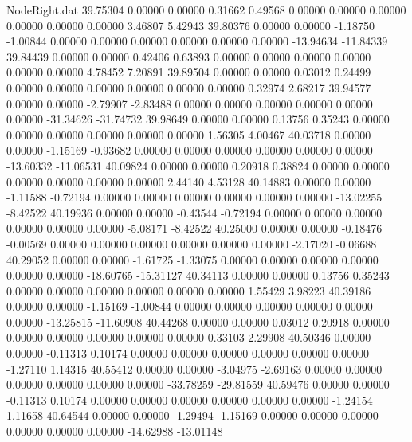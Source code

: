 \begin{filecontents}{NodeRight.dat}
  39.75304    0.00000    0.00000     0.31662    0.49568    0.00000    0.00000    0.00000    0.00000    0.00000    0.00000    3.46807    5.42943
  39.80376    0.00000    0.00000    -1.18750   -1.00844    0.00000    0.00000    0.00000    0.00000    0.00000    0.00000  -13.94634  -11.84339
  39.84439    0.00000    0.00000     0.42406    0.63893    0.00000    0.00000    0.00000    0.00000    0.00000    0.00000    4.78452    7.20891
  39.89504    0.00000    0.00000     0.03012    0.24499    0.00000    0.00000    0.00000    0.00000    0.00000    0.00000    0.32974    2.68217
  39.94577    0.00000    0.00000    -2.79907   -2.83488    0.00000    0.00000    0.00000    0.00000    0.00000    0.00000  -31.34626  -31.74732
  39.98649    0.00000    0.00000     0.13756    0.35243    0.00000    0.00000    0.00000    0.00000    0.00000    0.00000    1.56305    4.00467
  40.03718    0.00000    0.00000    -1.15169   -0.93682    0.00000    0.00000    0.00000    0.00000    0.00000    0.00000  -13.60332  -11.06531
  40.09824    0.00000    0.00000     0.20918    0.38824    0.00000    0.00000    0.00000    0.00000    0.00000    0.00000    2.44140    4.53128
  40.14883    0.00000    0.00000    -1.11588   -0.72194    0.00000    0.00000    0.00000    0.00000    0.00000    0.00000  -13.02255   -8.42522
  40.19936    0.00000    0.00000    -0.43544   -0.72194    0.00000    0.00000    0.00000    0.00000    0.00000    0.00000   -5.08171   -8.42522
  40.25000    0.00000    0.00000    -0.18476   -0.00569    0.00000    0.00000    0.00000    0.00000    0.00000    0.00000   -2.17020   -0.06688
  40.29052    0.00000    0.00000    -1.61725   -1.33075    0.00000    0.00000    0.00000    0.00000    0.00000    0.00000  -18.60765  -15.31127
  40.34113    0.00000    0.00000     0.13756    0.35243    0.00000    0.00000    0.00000    0.00000    0.00000    0.00000    1.55429    3.98223
  40.39186    0.00000    0.00000    -1.15169   -1.00844    0.00000    0.00000    0.00000    0.00000    0.00000    0.00000  -13.25815  -11.60908
  40.44268    0.00000    0.00000     0.03012    0.20918    0.00000    0.00000    0.00000    0.00000    0.00000    0.00000    0.33103    2.29908
  40.50346    0.00000    0.00000    -0.11313    0.10174    0.00000    0.00000    0.00000    0.00000    0.00000    0.00000   -1.27110    1.14315
  40.55412    0.00000    0.00000    -3.04975   -2.69163    0.00000    0.00000    0.00000    0.00000    0.00000    0.00000  -33.78259  -29.81559
  40.59476    0.00000    0.00000    -0.11313    0.10174    0.00000    0.00000    0.00000    0.00000    0.00000    0.00000   -1.24154    1.11658
  40.64544    0.00000    0.00000    -1.29494   -1.15169    0.00000    0.00000    0.00000    0.00000    0.00000    0.00000  -14.62988  -13.01148

\end{filecontents}
